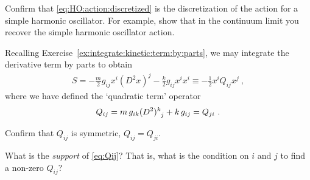 \begin{exercise}
Confirm that \eqref{eq:HO:action:discretized} is the discretization of the action for a simple harmonic oscillator. For example, show that in the continuum limit you recover the simple harmonic oscillator action. 
\end{exercise}
Recalling Exercise~\ref{ex:integrate:kinetic:term:by:parts}, we may integrate the derivative term by parts to obtain
\begin{align}
    S = 
    -
    \frac{m}{2} g_{ij}x^i (D^2x)^j 
    - \frac{k}{2} g_{ij} x^ix^i
    \equiv
    -\frac{1}{2}x^i Q_{ij} x^j
    \ ,
    \label{eq:HO:action:discretized:integrated}
\end{align}
where we have defined the `quadratic term' operator
\begin{align}
    Q_{ij} = 
    m\, g_{ik}(D^2)\aij{k}{j} 
    + 
    k\, g_{ij} 
    = Q_{ji} \ .
    \label{eq:Qij}
\end{align}
\begin{exercise}
Confirm that $Q_{ij}$ is symmetric, $Q_{ij} = Q_{ji}$. 
\end{exercise}
\begin{exercise}
What is the \emph{support} of \eqref{eq:Qij}? That is, what is the condition on $i$ and $j$ to find a non-zero $Q_{ij}$?
\end{exercise}

